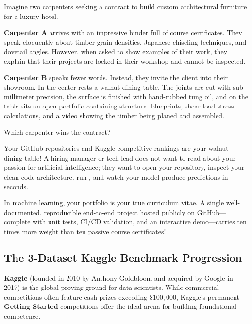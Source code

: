 \begin{analogy}
Imagine two carpenters seeking a contract to build custom architectural furniture for a luxury hotel.

\textbf{Carpenter A} arrives with an impressive binder full of course certificates. They speak eloquently about timber grain densities, Japanese chiseling techniques, and dovetail angles. However, when asked to show examples of their work, they explain that their projects are locked in their workshop and cannot be inspected.

\textbf{Carpenter B} speaks fewer words. Instead, they invite the client into their showroom. In the center rests a walnut dining table. The joints are cut with sub-millimeter precision, the surface is finished with hand-rubbed tung oil, and on the table sits an open portfolio containing structural blueprints, shear-load stress calculations, and a video showing the timber being planed and assembled.

Which carpenter wins the contract?

Your GitHub repositories and Kaggle competitive rankings are your walnut dining table! A hiring manager or tech lead does not want to read about your passion for artificial intelligence; they want to open your repository, inspect your clean code architecture, run , and watch your model produce predictions in seconds.
\end{analogy}

\begin{keyidea}
In machine learning, your portfolio is your true curriculum vitae. A single well-documented, reproducible end-to-end project hosted publicly on GitHub---complete with unit tests, CI/CD validation, and an interactive demo---carries ten times more weight than ten passive course certificates!
\end{keyidea}

\subsection{The 3-Dataset Kaggle Benchmark Progression}\label{subsec:kaggle_progression}

\textbf{Kaggle} (founded in 2010 by Anthony Goldbloom and acquired by Google in 2017) is the global proving ground for data scientists. While commercial competitions often feature cash prizes exceeding $\$100{,}000$, Kaggle's permanent \textbf{Getting Started} competitions offer the ideal arena for building foundational competence.


